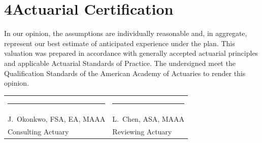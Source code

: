 \section{4\quad Actuarial Certification}
In our opinion, the assumptions are individually reasonable and, in aggregate, represent our
best estimate of anticipated experience under the plan. This valuation was prepared in
accordance with generally accepted actuarial principles and applicable Actuarial Standards
of Practice. The undersigned meet the Qualification Standards of the American Academy of
Actuaries to render this opinion.

\vspace{1.0cm}
\begin{tabularx}{\linewidth}{@{}X X@{}}
\rule{6cm}{0.5pt} & \hfill\rule{6cm}{0.5pt}\\
J.\ Okonkwo, FSA, EA, MAAA & \hfill L.\ Chen, ASA, MAAA\\
Consulting Actuary & \hfill Reviewing Actuary\\
\end{tabularx}
